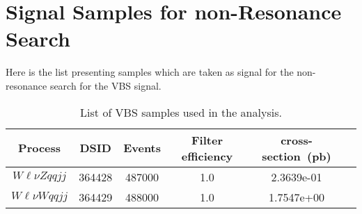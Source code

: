\section{Signal Samples for non-Resonance Search}
Here is the list presenting samples which are taken as signal for the non-resonance search for the VBS signal.
\begin{table}[!htbp]
	\begin{center}
		\small
		\caption{List of VBS samples used in the analysis. 
		}
		\begin{tabular}{|c|c|c|c|c|c|}
			\hline
			Process & DSID & Events & Filter efficiency & cross-section~(pb) \\
			\hline 
			$W\ell\nu Zqq jj$  & 364428   &   487000 &  1.0  &  2.3639e-01  \\
			$W\ell\nu Wqq jj$  & 364429   &   488000 &  1.0  &  1.7547e+00  \\
			
			\hline
		\end{tabular}
		\label{tab:VBS_sig_samples}
	\end{center}
\end{table}

